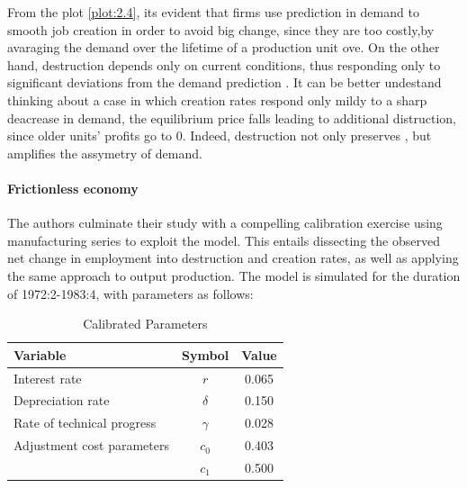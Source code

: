 \documentclass[12pt]{article}
\begin{document}
From the plot \ref{plot:2.4}, its evident that firms use prediction in demand to smooth job creation in order to avoid
big change, since they are too costly,by avaraging the demand over the lifetime of a production unit ove. On the other
hand, destruction depends only on current conditions, thus responding only to significant deviations from the demand
prediction . It can be better undestand thinking about a case in which creation rates respond only mildy to a sharp
deacrease in demand, the equilibrium price falls leading to additional distruction, since older units' profits go to 0.
Indeed, destruction not only preserves , but amplifies the assymetry of demand.\paragraph{Frictionless economy}
\par
The authors culminate their study with a compelling calibration exercise using manufacturing series to exploit the
model. This entails dissecting the observed net change in employment into destruction and creation rates, as well as
applying the same approach to output production. The model is simulated for the duration of 1972:2-1983:4, with
parameters as follows: 


\begin{table}[ht]
    \centering
    \caption{Calibrated Parameters}
    \label{Tab2.1}
    \begin{tabular}{lcc}
    \hline \hline
    Variable & Symbol & Value \\
    \hline
    Interest rate & $r$ & 0.065 \\
    Depreciation rate & $\delta$ & 0.150 \\
    Rate of technical progress & $\gamma$ & 0.028 \\
    Adjustment cost parameters & $c_0$ & 0.403 \\
     & $c_1$ & 0.500 \\
    \hline
    \end{tabular}
    \end{table}
    
\end{document}
